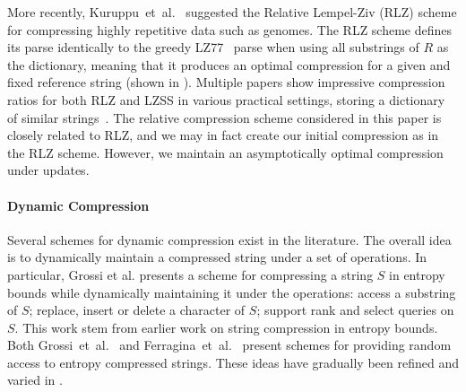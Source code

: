 More recently, Kuruppu~et~al.~\cite{kuruppu2010relative} suggested the Relative Lempel-Ziv (RLZ) scheme for compressing highly repetitive data such as genomes. 
The RLZ scheme defines its parse identically to the greedy LZ77~\cite{lz1977} parse when using all substrings of $R$ as the dictionary, meaning that it produces an optimal compression for a given and fixed reference string (shown in \cite{cohn1996parsing,Storer1982,Crochemore201455}).  
Multiple papers show impressive compression ratios for both RLZ and LZSS in various practical settings, storing a dictionary of similar strings~\cite{ferragina2013bit,kuruppu2011optimized,chern2012reference,do2014fast,hoobin2011relative,kuruppu2011reference,wandelt2013fresco,deorowicz2011robust,wandelt2012adaptive,ochoa2014idocomp}. 
The relative compression scheme considered in this paper is closely related to RLZ, and we may in fact create our initial compression as in the RLZ scheme. However, we maintain an asymptotically optimal compression under updates.
    
\paragraph{Dynamic Compression}
Several schemes for dynamic compression exist in the literature. The overall idea is to dynamically maintain a compressed string under a set of operations. In particular, Grossi et al. \cite{grossi2013} presents a scheme for compressing a string $S$ in entropy bounds while dynamically maintaining  it under the operations: access a substring of $S$; replace, insert or delete a character of $S$; support rank and select queries on $S$. This work stem from earlier work on string compression in entropy bounds. Both Grossi~et~al.~\cite{Grossi03} and Ferragina~et~al.~\cite{Ferragina04succinctrepresentation} present schemes for providing random access to entropy compressed strings. These ideas have gradually been refined and varied in \cite{Ferragina04succinctrepresentation, ferragina2005indexing, Sadakane2006, Bin2007, Ferragina2007, Jansson12_cram, navarro2013optimal}.

